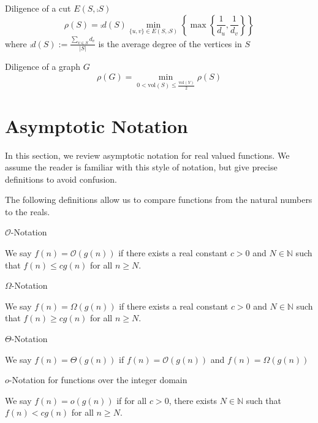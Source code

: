 \begin{definition}
	Diligence of a cut $ E(S, \comp{S}) $
	$$
		\rho(S) = \comp{d}(S) \min_{\{u, v\} \in E(S, \comp{S}) } \left\{ \max \left\{ \frac{1}{d_u},\frac{1}{d_v} \right\} \right\}
	$$ 
	where $\comp{d}(S) := \frac{\sum_{v \in S} d_v}{|S|}$ is the average degree of the vertices in $S$
\end{definition}

\begin{definition} %
	Diligence of a graph $G$
	$$
		\rho(G) = \min_{0 < \text{vol}(S) \leq \frac{\text{vol}(V)}{2}} \rho(S) 
	$$
\end{definition}

\section{Asymptotic Notation}

In this section, we review asymptotic notation for real valued functions. We assume the reader is familiar with this style of notation, but give precise definitions to avoid confusion. %

The following definitions allow us to compare functions from the natural numbers to the reals.

\begin{definition}
	$\mathcal{O}$-Notation

	\noindent
	We say $f(n) = \mathcal{O}(g(n))$ if there exists a real constant $c > 0$ and $N \in \mathbb{N}$ such that $f(n) \leq c g(n)$ for all $n \geq N$. 
\end{definition}

\begin{definition}
	$\Omega$-Notation

	\noindent
	We say $f(n) = \Omega(g(n))$ if there exists a real constant $c > 0$ and $N \in \mathbb{N}$ such that $f(n) \geq c g(n)$ for all $n \geq N$. 
\end{definition}

\begin{definition}
	$\Theta$-Notation

	\noindent
	We say $f(n) = \Theta(g(n))$ if $f(n) = \mathcal{O}(g(n))$ and $f(n) = \Omega(g(n))$
\end{definition}


\begin{definition}
	$o$-Notation for functions over the integer domain

	\noindent
	We say $f(n) = o(g(n))$ if for all $c > 0$, there exists $N \in \mathbb{N}$ such that $f(n) < c g(n)$ for all $n \geq N$.
\end{definition}

